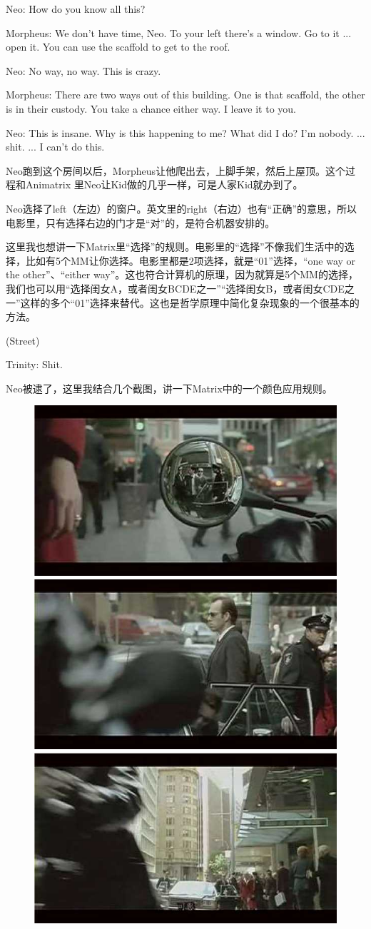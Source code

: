 \documentclass{ctexart}
\newenvironment{myquote}{\color{green} \setlength{\leftskip}{6em} \setlength{\rightskip}{4em} \setlength{\parindent}{-2em}}{\par}
\begin{document}
\begin{myquote}
Neo: How do you know all this?

Morpheus: We don't have time, Neo. To your left there's a window. Go to it ... open it. You can use the scaffold to get to the roof.

Neo: No way, no way. This is crazy.

Morpheus: There are two ways out of this building. One is that scaffold, the other is in their custody. You take a chance either way. I leave it to you.

Neo: This is insane. Why is this happening to me? What did I do? I'm nobody. ... shit. ... I can't do this.
\end{myquote}

Neo跑到这个房间以后，Morpheus让他爬出去，上脚手架，然后上屋顶。这个过程和Animatrix 里Neo让Kid做的几乎一样，可是人家Kid就办到了。

Neo选择了left（左边）的窗户。英文里的right（右边）也有“正确”的意思，所以电影里，只有选择右边的门才是“对”的，是符合机器安排的。

这里我也想讲一下Matrix里“选择”的规则。电影里的“选择”不像我们生活中的选择，比如有5个MM让你选择。电影里都是2项选择，就是“01”选择，“one way or the other”、“either way”。这也符合计算机的原理，因为就算是5个MM的选择，我们也可以用“选择闺女A，或者闺女BCDE之一”“选择闺女B，或者闺女CDE之一”这样的多个“01”选择来替代。这也是哲学原理中简化复杂现象的一个很基本的方法。

\begin{myquote}
(Street)

Trinity: Shit.
\end{myquote}

Neo被逮了，这里我结合几个截图，讲一下Matrix中的一个颜色应用规则。

\begin{figure}[htb]
\centering
\includegraphics[width=0.5\linewidth]{fig/read_Matrix-12}
\includegraphics[width=0.5\linewidth]{fig/read_Matrix-13}
\includegraphics[width=0.5\linewidth]{fig/read_Matrix-14}
\end{figure}
\end{document}
